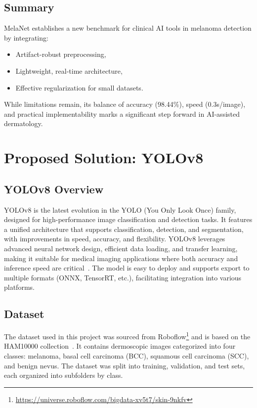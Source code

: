 \documentclass[a4paper,12pt]{report}
\begin{document}
\begin{spacing}{1.5}
    \section{Summary}
    
    MelaNet establishes a new benchmark for clinical AI tools in melanoma detection by integrating:
    \begin{itemize}
        \item Artifact-robust preprocessing,
        \item Lightweight, real-time architecture,
        \item Effective regularization for small datasets.
    \end{itemize}
    While limitations remain, its balance of accuracy (98.44\%), speed (0.3s/image), and practical implementability marks a significant step forward in AI-assisted dermatology.

\newpage

\chapter{Proposed Solution: YOLOv8}
    
    \section{YOLOv8 Overview}
    YOLOv8 is the latest evolution in the YOLO (You Only Look Once) family, designed for high-performance image classification and detection tasks. It features a unified architecture that supports classification, detection, and segmentation, with improvements in speed, accuracy, and flexibility. YOLOv8 leverages advanced neural network design, efficient data loading, and transfer learning, making it suitable for medical imaging applications where both accuracy and inference speed are critical~\cite{ultralytics23}. The model is easy to deploy and supports export to multiple formats (ONNX, TensorRT, etc.), facilitating integration into various platforms.
    
    \section{Dataset}
    The dataset used in this project was sourced from Roboflow\footnote{\url{https://universe.roboflow.com/bigdata-xv5t7/skin-9nkfv}} and is based on the HAM10000 collection~\cite{intro5}. It contains dermoscopic images categorized into four classes: melanoma, basal cell carcinoma (BCC), squamous cell carcinoma (SCC), and benign nevus. The dataset was split into training, validation, and test sets, each organized into subfolders by class.
    

\end{spacing}
\end{document}
